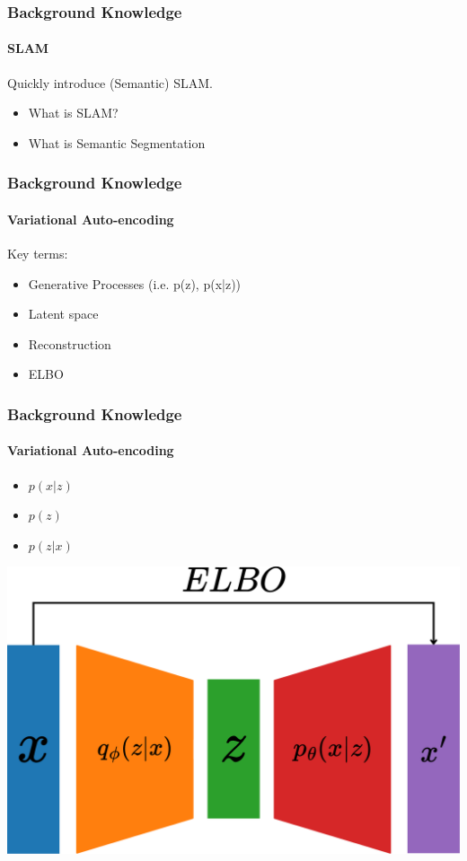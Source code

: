 \documentclass[t,aspectratio=169]{beamer}
\begin{document}
\begin{frame}[fragile]
  \frametitle{Background Knowledge}
  \framesubtitle{SLAM}
  Quickly introduce (Semantic) SLAM.
  \begin{itemize}
    \item What is SLAM?
    \item What is Semantic Segmentation
  \end{itemize}
\end{frame}

\begin{frame}[fragile]
  \frametitle{Background Knowledge}
  \framesubtitle{Variational Auto-encoding}
  Key terms:
  \begin{itemize}
    \item Generative Processes (i.e. p(z), p(x|z))
    \item Latent space
    \item Reconstruction
    \item ELBO
  \end{itemize}
\end{frame}

\begin{frame}[fragile]
  \frametitle{Background Knowledge}
  \framesubtitle{Variational Auto-encoding}
  \begin{minipage}[t]{0.5\textwidth}
    \vspace{0pt}
    \begin{itemize}
      \item $p(x|z)$
      \item $p(z)$
      \item $p(z|x)$
    \end{itemize}
  \end{minipage}%
  \hfill
  \begin{minipage}[t]{0.5\textwidth}
    \vspace{0pt}
    \includegraphics[width=\textwidth]{figures/vae.png}
  \end{minipage}
\end{frame}
\end{document}
